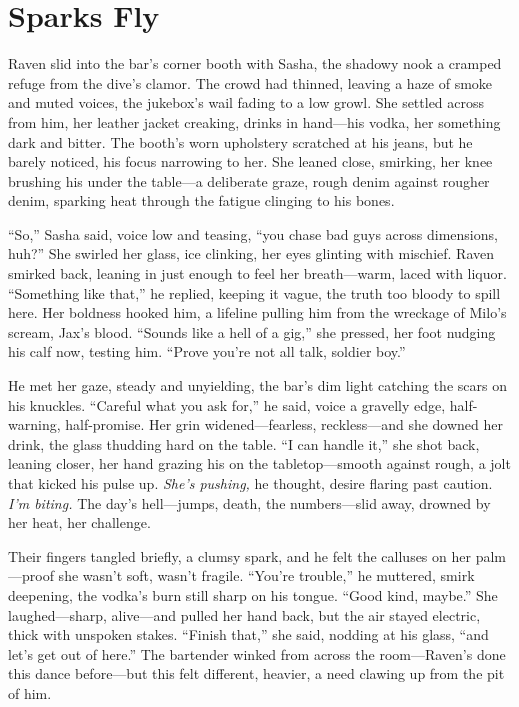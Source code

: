 \documentclass[12pt]{book}
\begin{document}
\section{Sparks Fly}

Raven slid into the bar’s corner booth with Sasha, the shadowy nook a cramped refuge from the dive’s clamor. The crowd had thinned, leaving a haze of smoke and muted voices, the jukebox’s wail fading to a low growl. She settled across from him, her leather jacket creaking, drinks in hand—his vodka, her something dark and bitter. The booth’s worn upholstery scratched at his jeans, but he barely noticed, his focus narrowing to her. She leaned close, smirking, her knee brushing his under the table—a deliberate graze, rough denim against rougher denim, sparking heat through the fatigue clinging to his bones.

“So,” Sasha said, voice low and teasing, “you chase bad guys across dimensions, huh?” She swirled her glass, ice clinking, her eyes glinting with mischief. Raven smirked back, leaning in just enough to feel her breath—warm, laced with liquor. “Something like that,” he replied, keeping it vague, the truth too bloody to spill here. Her boldness hooked him, a lifeline pulling him from the wreckage of Milo’s scream, Jax’s blood. “Sounds like a hell of a gig,” she pressed, her foot nudging his calf now, testing him. “Prove you’re not all talk, soldier boy.”

He met her gaze, steady and unyielding, the bar’s dim light catching the scars on his knuckles. “Careful what you ask for,” he said, voice a gravelly edge, half-warning, half-promise. Her grin widened—fearless, reckless—and she downed her drink, the glass thudding hard on the table. “I can handle it,” she shot back, leaning closer, her hand grazing his on the tabletop—smooth against rough, a jolt that kicked his pulse up. \textit{She’s pushing,} he thought, desire flaring past caution. \textit{I’m biting.} The day’s hell—jumps, death, the numbers—slid away, drowned by her heat, her challenge.

Their fingers tangled briefly, a clumsy spark, and he felt the calluses on her palm—proof she wasn’t soft, wasn’t fragile. “You’re trouble,” he muttered, smirk deepening, the vodka’s burn still sharp on his tongue. “Good kind, maybe.” She laughed—sharp, alive—and pulled her hand back, but the air stayed electric, thick with unspoken stakes. “Finish that,” she said, nodding at his glass, “and let’s get out of here.” The bartender winked from across the room—Raven’s done this dance before—but this felt different, heavier, a need clawing up from the pit of him.
\end{document}
